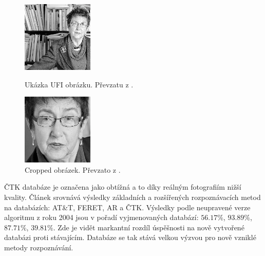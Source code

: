 \documentclass[czech,BP]{thesiskiv}
\begin{document}
\begin{figure}[h!]
\centering
\begin{minipage}{.4\textwidth}
  \centering
  \includegraphics[width=0.7\linewidth]{img/ufi1.png}
	\caption{Ukázka UFI obrázku. Převzatu z \cite{Ufi2015online}.}
  \label{fig:ufi1}
\end{minipage}%
\hspace{1.5cm}
\begin{minipage}{.4\textwidth}
  \centering
  \includegraphics[width=.7\linewidth]{img/cropped1.png}
  \caption{Cropped obrázek. Převzato z \cite{Ufi2015online}.}
\label{fig:cropped1}
\end{minipage}
\end{figure}

ČTK databáze je označena jako obtížná a to díky reálným fotografiím nižší kvality. Článek \cite{LencKral2016} srovnává výsledky základních a rozšířených rozpoznávacích metod na databázích: AT\&T, FERET, AR a ČTK. Výsledky podle neupravené  verze algoritmu \cite{Ahonen2004} z roku 2004 jsou v pořadí vyjmenovaných databází: $56.17\%$, $93.89\%$, $87.71\%$, $39.81\%$. Zde je vidět markantní rozdíl úspěšnosti na nově vytvořené databázi proti stávajícím. Databáze se tak stává velkou výzvou pro nově vzniklé metody rozpoznávání.
\end{document}
